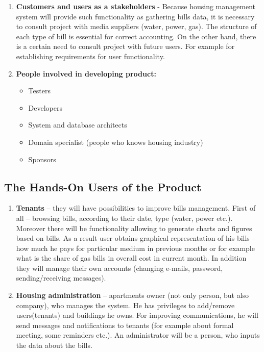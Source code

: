 \documentclass[a4paper,10pt]{report}
\begin{document}
\begin{enumerate} 
\item \textbf{Customers and users as a stakeholders} - Because housing management system will provide such functionality as gathering bills data, it is necessary to consult project with media suppliers (water, power, gas). The structure of each type of bill is essential for correct  accounting.
On the other hand, there is a certain need to consult project with future users. For example for establishing requirements for user functionality.


\item \textbf{People involved in developing product:}
\begin{itemize}
	\item Testers
	\item Developers
	\item System and database architects
	\item Domain specialist (people who knows housing industry)
	\item Sponsors
\end{itemize}
\end{enumerate}

\subsection{The Hands-On Users of the Product}
\begin{enumerate}
	\item  \textbf{Tenants} –  they will have possibilities to improve bills management. First of all – browsing bills, according to their date, type (water, power etc.). Moreover there will be functionality allowing to generate charts and figures based on bills. As a result user obtains graphical representation of his bills – how much he pays for particular medium in previous months or for example what is the share of gas bills in overall cost in current month.
            	In addition they will manage their own accounts (changing e-mails, password, sending/receiving messages).

	\item  \textbf{Housing administration} – apartments owner (not only person, but also company), who manages the system. He has privileges to add/remove users(tenants) and buildings he owns. For improving communications, he will send messages and notifications to tenants (for example about formal meeting, some reminders etc.). An administrator will be a person, who inputs the data about the bills.
\end{enumerate}
\end{document}
